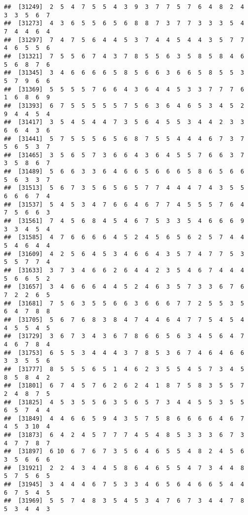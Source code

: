 \documentclass[
]{book}
\begin{document}
\begin{verbatim}
##  [31249]  2  5  4  7  5  5  4  3  9  3  7  7  5  7  6  4  8  2  4  3  3  5  6  7
##  [31273]  4  3  6  5  5  6  5  6  8  8  7  3  7  7  3  3  3  5  4  7  4  4  6  4
##  [31297]  7  4  7  5  6  4  4  5  3  7  4  4  5  4  4  3  5  7  7  4  6  5  5  6
##  [31321]  7  5  5  6  7  4  3  7  8  5  5  6  3  5  8  5  8  4  6  5  6  8  7  6
##  [31345]  3  4  6  6  6  6  5  8  5  6  6  3  6  6  5  8  5  5  3  5  7  9  6  6
##  [31369]  5  5  5  5  7  6  6  4  3  6  4  4  5  3  3  7  7  7  6  1  6  8  6  9
##  [31393]  6  7  5  5  5  5  5  7  5  6  3  6  4  6  5  3  4  5  2  9  4  4  5  4
##  [31417]  3  5  4  5  4  4  7  3  5  6  4  5  5  3  4  4  2  3  3  6  6  4  3  6
##  [31441]  5  7  5  5  5  6  5  6  8  7  5  5  4  4  4  6  7  3  7  5  6  5  3  7
##  [31465]  3  5  6  5  7  3  6  6  4  3  6  4  5  5  7  6  6  3  7  3  5  8  6  7
##  [31489]  5  6  6  3  3  6  4  6  6  5  6  6  6  5  8  6  5  6  6  5  6  3  3  7
##  [31513]  5  6  7  3  5  6  5  6  5  7  7  4  4  4  7  4  3  5  5  6  6  6  7  4
##  [31537]  5  4  5  3  4  7  6  6  4  6  7  7  4  5  5  5  7  6  4  7  5  6  6  3
##  [31561]  7  4  5  6  8  4  5  4  6  7  5  3  3  5  4  6  6  6  9  3  3  4  5  4
##  [31585]  4  7  6  6  6  6  4  5  2  4  5  6  5  6  2  5  7  4  4  5  4  6  4  4
##  [31609]  4  2  5  6  4  5  3  4  6  6  4  3  5  7  4  7  7  5  3  5  5  7  7  4
##  [31633]  3  7  3  4  6  6  2  6  4  4  2  3  5  4  6  7  4  4  4  5  6  6  5  2
##  [31657]  3  4  6  6  6  4  4  5  2  4  6  3  5  7  3  3  6  7  6  7  2  2  6  5
##  [31681]  7  5  6  3  5  5  6  6  3  6  6  6  7  7  2  5  5  3  5  6  4  7  8  8
##  [31705]  5  6  7  6  8  3  8  4  7  4  4  6  4  7  7  5  4  5  4  4  5  5  4  5
##  [31729]  3  6  7  3  4  3  6  7  8  6  6  5  6  3  4  5  6  4  7  4  6  7  8  4
##  [31753]  6  5  5  3  4  4  4  3  7  8  5  3  6  7  4  6  4  6  6  3  3  5  5  6
##  [31777]  8  5  5  5  6  5  1  4  6  2  3  5  5  4  5  7  3  4  5  8  5  8  4  2
##  [31801]  6  7  4  5  7  6  2  6  2  4  1  8  7  5  8  3  5  5  7  2  4  8  7  5
##  [31825]  4  5  3  5  5  6  3  5  6  5  7  3  4  4  5  5  3  5  5  6  5  7  4  4
##  [31849]  4  4  6  6  5  9  4  3  5  7  5  8  6  6  6  6  4  6  7  4  5  3 10  4
##  [31873]  6  4  2  4  5  7  7  7  4  5  4  8  5  3  3  3  6  7  3  4  7  7  8  7
##  [31897]  6 10  6  7  6  7  3  5  6  4  6  5  5  4  8  2  4  5  6  3  5  6  6  6
##  [31921]  2  2  4  3  4  4  5  8  6  4  6  5  5  4  7  3  4  4  8  5  7  5  6  5
##  [31945]  3  4  4  4  6  7  5  3  3  4  6  5  6  4  6  6  5  4  4  6  7  5  4  5
##  [31969]  5  5  7  4  8  3  5  4  5  3  4  7  6  7  3  4  4  7  8  5  3  4  4  3

\end{verbatim}
\end{document}
